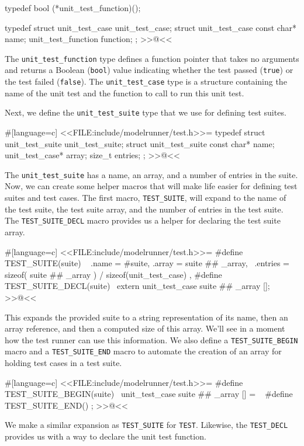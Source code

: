 typedef bool (*unit_test_function)();

typedef struct unit_test_case unit_test_case;
struct unit_test_case
{
    const char* name;
    unit_test_function function;
};
>>@<<

The \verb/unit_test_function/ type defines a function pointer that takes no
arguments and returns a Boolean (\verb/bool/) value indicating whether the test
passed (\verb/true/) or the test failed (\verb/false/). The
\verb/unit_test_case/ type is a structure containing the name of the unit test
and the function to call to run this unit test.

Next, we define the \verb/unit_test_suite/ type that we use for defining test
suites.

#[language=c]
<<FILE:include/modelrunner/test.h>>=
typedef struct unit_test_suite unit_test_suite;
struct unit_test_suite
{
    const char* name;
    unit_test_case* array;
    size_t entries;
};
>>@<<

The \verb/unit_test_suite/ has a name, an array, and a number of entries in the
suite. Now, we can create some helper macros that will make life easier for
defining test suites and test cases. The first macro, \verb/TEST_SUITE/, will
expand to the name of the test suite, the test suite array, and the number of
entries in the test suite. The \verb/TEST_SUITE_DECL/ macro provides us a helper
for declaring the test suite array.

#[language=c]
<<FILE:include/modelrunner/test.h>>=
#define TEST_SUITE(suite) \
    { .name = #suite, .array = suite ## _array, \
      .entries = sizeof( suite ## _array ) / sizeof(unit_test_case) },
#define TEST_SUITE_DECL(suite) \
    extern unit_test_case suite ## _array [];
>>@<<

This expands the provided suite to a string representation of its name, then an
array reference, and then a computed size of this array.  We'll see in a moment
how the test runner can use this information. We also define a
\verb/TEST_SUITE_BEGIN/ macro and a \verb/TEST_SUITE_END/ macro to automate the
creation of an array for holding test cases in a test suite.

#[language=c]
<<FILE:include/modelrunner/test.h>>=
#define TEST_SUITE_BEGIN(suite) \
    unit_test_case suite ## _array [] = \
    {
#define TEST_SUITE_END() };
>>@<<

We make a similar expansion as \verb/TEST_SUITE/ for \verb/TEST/. Likewise, the
\verb/TEST_DECL/ provides us with a way to declare the unit test function.

